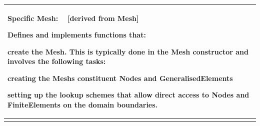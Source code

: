\begin{center}
\begin{longtabu}
\begin{center}
\begin{tabularx}{\linewidth}{|*{1}{>{\raggedright\arraybackslash}X|}}
\begin{center} {\bfseries Specific Mesh\+:} ~\newline
\mbox{[}derived from {\bfseries Mesh}\mbox{]} \end{center} 
\begin{DoxyItemize}
\item Defines and implements functions that\+:
\begin{DoxyItemize}
\item create the Mesh. This is typically done in the Mesh constructor and involves the following tasks\+:
\begin{DoxyItemize}
\item creating the {\ttfamily Mesh\textquotesingle{}s} constituent {\ttfamily Nodes} and {\ttfamily Generalised\+Elements} 
\item setting up the lookup schemes that allow direct access to {\ttfamily Nodes} and {\ttfamily Finite\+Elements} on the domain boundaries.   
\end{DoxyItemize}
\end{DoxyItemize}
\end{DoxyItemize}\\\cline{1-1}
\end{tabularx}
\end{center}    \\
\end{longtabu}
\end{center} 


